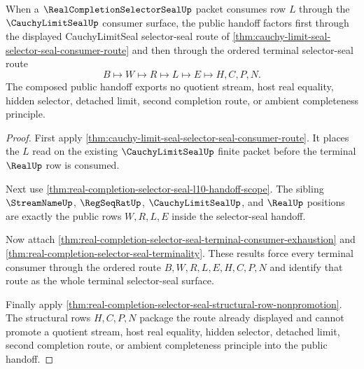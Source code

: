 \begin{theorem}
\label{thm:cauchy-limit-seal-selector-seal-public-handoff}
When a $\RealCompletionSelectorSealUp$ packet consumes row $L$ through the $\CauchyLimitSealUp$ consumer surface, the public handoff factors first through the displayed CauchyLimitSeal selector-seal route of \autoref{thm:cauchy-limit-seal-selector-seal-consumer-route} and then through the ordered terminal selector-seal route
$$
B \longmapsto W \longmapsto R \longmapsto L \longmapsto E \longmapsto H,C,P,N.
$$
The composed public handoff exports no quotient stream, host real equality, hidden selector, detached limit, second completion route, or ambient completeness principle.
\end{theorem}
\begin{proof}
First apply \autoref{thm:cauchy-limit-seal-selector-seal-consumer-route}. It places the $L$ read on the existing $\CauchyLimitSealUp$ finite packet before the terminal $\RealUp$ row is consumed.

Next use \autoref{thm:real-completion-selector-seal-l10-handoff-scope}. The sibling $\StreamNameUp$, $\RegSeqRatUp$, $\CauchyLimitSealUp$, and $\RealUp$ positions are exactly the public rows $W,R,L,E$ inside the selector-seal handoff.

Now attach \autoref{thm:real-completion-selector-seal-terminal-consumer-exhaustion} and \autoref{thm:real-completion-selector-seal-terminality}. These results force every terminal consumer through the ordered route $B,W,R,L,E,H,C,P,N$ and identify that route as the whole terminal selector-seal surface.

Finally apply \autoref{thm:real-completion-selector-seal-structural-row-nonpromotion}. The structural rows $H,C,P,N$ package the route already displayed and cannot promote a quotient stream, host real equality, hidden selector, detached limit, second completion route, or ambient completeness principle into the public handoff.
\end{proof}




